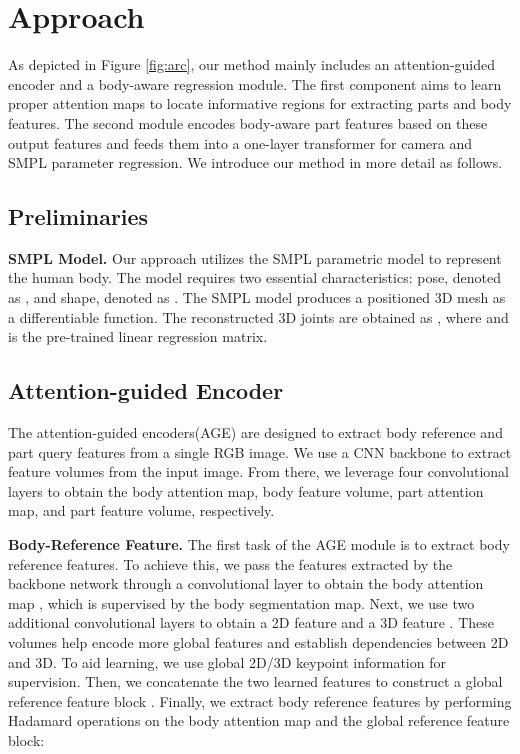 \documentclass[10pt,twocolumn,letterpaper]{article}
\begin{document}
\section{Approach}
As depicted in Figure \ref{fig:arc}, our method mainly includes an attention-guided encoder and a body-aware regression module. The first component aims to learn proper attention maps to locate informative regions for extracting parts and body features. The second module encodes body-aware part features based on these output features and feeds them into a one-layer transformer for camera and SMPL parameter regression. We introduce our method in more detail as follows. 

 

\subsection{Preliminaries}

\textbf{SMPL Model.} Our approach utilizes the SMPL parametric model to represent the human body. The model requires two essential characteristics: pose, denoted as , and shape, denoted as . 
The SMPL model produces a positioned 3D mesh  as a differentiable function. The reconstructed 3D joints are obtained as , where  and  is the pre-trained linear regression matrix.

\subsection{Attention-guided Encoder}
The attention-guided encoders(AGE) are designed to extract body reference and part query features from a single RGB image. We use a CNN backbone to extract feature volumes from the input image. From there, we leverage four convolutional layers to obtain the body attention map, body feature volume, part attention map, and part feature volume, respectively. 

\noindent\textbf{Body-Reference Feature.}
The first task of the AGE module is to extract body reference features. To achieve this, we pass the features extracted by the backbone network through a convolutional layer to obtain the body attention map , which is supervised by the body segmentation map. Next, we use two additional convolutional layers to obtain a 2D feature  and a 3D feature . These volumes help encode more global features and establish dependencies between 2D and 3D. To aid learning, we use global 2D/3D keypoint information for supervision. Then, we concatenate the two learned features to construct a global reference feature block . Finally, we extract body reference features  by performing Hadamard operations on the body attention map and the global reference feature block:
\end{document}
